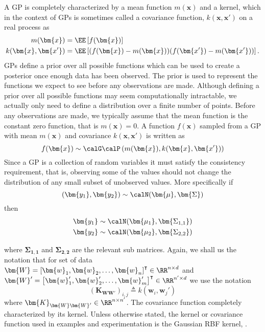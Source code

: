 A GP is completely characterized by a mean function $m(\bm{x})$ and a kernel, which in the context of GPs is sometimes called a covariance function, $k (\bm{x}, \bm{x'})$ on a real process as
\begin{align*}
    m(\bm{x})           & = \EE \left[ f(\bm{x}) \right]                                          \\
    k (\bm{x}, \bm{x'}) & = \EE \left[ (f(\bm{x}) - m(\bm{x})) (f(\bm{x'}) - m(\bm{x'})) \right].
\end{align*}
GPs define a prior over all possible functions which can be used to create a posterior once enough data has been observed. The prior is used to represent the functions we expect to see before any observations are made. Although defining a prior over all possible functions may seem computationally intractable, we actually only need to define a distribution over a finite number of points. Before any observations are made, we typically assume that the mean function is the constant zero function, that is $m \left( \bm{x} \right) = 0$. A function $f(\bm{x})$ sampled from a GP with mean $m(\bm{x})$ and covariance $k (\bm{x}, \bm{x'})$ is written as
\[
    f(\bm{x}) \sim \calG \calP \left( m(\bm{x}), k (\bm{x}, \bm{x'}) \right)
\]
Since a GP is a collection of random variables it must satisfy the consistency requirement, that is, observing some of the values should not change the distribution of any small subset of unobserved values. More specifically if
\[
    (\bm{y_1}, \bm{y_2}) \sim \calN (\bm{\mu}, \bm{\Sigma})
\]
then
\begin{align*}
    \bm{y_1} & \sim \calN (\bm{\mu_1}, \bm{\Sigma_{1,1}}) \\
    \bm{y_2} & \sim \calN (\bm{\mu_2}, \bm{\Sigma_{2,2}})
\end{align*}

where $\bm{\Sigma_{1,1}}$ and $\bm{\Sigma_{2,2}}$ are the relevant sub matrices. Again, we shall us the notation that for set of data $\bm{W} = \left[ \bm{w}_1 ,\bm{w}_2 , \ldots , \bm{w}_n \right]^{\intercal} \in \RR^{n \times d}$ and $\bm{W}' = \left[ \bm{w}_1' ,\bm{w}_2' , \ldots , \bm{w}_m' \right]^{\intercal} \in \RR^{n' \times d}$ we use the notation
\[
    \left( \bm{K}_{\bm{W} \bm{W}'} \right)_{i,j} \triangleq k \left( \bm{w}_i , \bm{w}_j' \right)
\]
where \( \bm{K}_{\bm{W} \bm{W}'} \in \RR^{n \times n'} \). The covariance function completely characterized by its kernel. Unless otherwise stated, the kernel or covariance function used in examples and experimentation is the Gaussian RBF kernel, .

